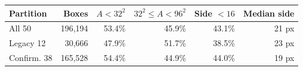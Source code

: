 \begin{tabular}{lrrrrr}
\toprule
Partition & Boxes & $A<32^2$ & $32^2\le A<96^2$ & Side $<16$ & Median side \\
\midrule
All 50 & 196,194 & 53.4\% & 45.9\% & 43.1\% & 21 px \\
Legacy 12 & 30,666 & 47.9\% & 51.7\% & 38.5\% & 23 px \\
Confirm. 38 & 165,528 & 54.4\% & 44.9\% & 44.0\% & 19 px \\
\bottomrule
\end{tabular}
